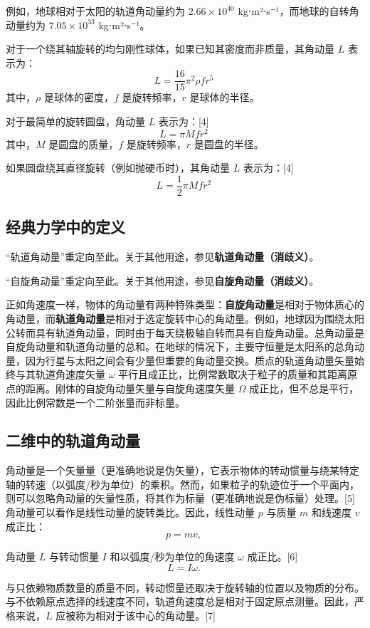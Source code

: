 例如，地球相对于太阳的轨道角动量约为 \( 2.66 \times 10^{40} \) kg⋅m²⋅s⁻¹，而地球的自转角动量约为 \( 7.05 \times 10^{33} \) kg⋅m²⋅s⁻¹。

对于一个绕其轴旋转的均匀刚性球体，如果已知其密度而非质量，其角动量 \( L \) 表示为：
\[
L = \frac{16}{15} \pi^2 \rho fr^5~
\]
其中，\( \rho \) 是球体的密度，\( f \) 是旋转频率，\( r \) 是球体的半径。

对于最简单的旋转圆盘，角动量 \( L \) 表示为：[4]
\[
L = \pi Mfr^2~
\]
其中，\( M \) 是圆盘的质量，\( f \) 是旋转频率，\( r \) 是圆盘的半径。

如果圆盘绕其直径旋转（例如抛硬币时），其角动量 \( L \) 表示为：[4]
\[
L = \frac{1}{2} \pi Mfr^2~
\]
\subsection{经典力学中的定义}   
“轨道角动量”重定向至此。关于其他用途，参见\textbf{轨道角动量（消歧义）}。  

“自旋角动量”重定向至此。关于其他用途，参见\textbf{自旋角动量（消歧义）}。

正如角速度一样，物体的角动量有两种特殊类型：\textbf{自旋角动量}是相对于物体质心的角动量，而\textbf{轨道角动量}是相对于选定旋转中心的角动量。例如，地球因为围绕太阳公转而具有轨道角动量，同时由于每天绕极轴自转而具有自旋角动量。总角动量是自旋角动量和轨道角动量的总和。在地球的情况下，主要守恒量是太阳系的总角动量，因为行星与太阳之间会有少量但重要的角动量交换。质点的轨道角动量矢量始终与其轨道角速度矢量 \( \omega \) 平行且成正比，比例常数取决于粒子的质量和其距离原点的距离。刚体的自旋角动量矢量与自旋角速度矢量 \( \Omega \) 成正比，但不总是平行，因此比例常数是一个二阶张量而非标量。
\subsection{二维中的轨道角动量}
角动量是一个矢量量（更准确地说是伪矢量），它表示物体的转动惯量与绕某特定轴的转速（以弧度/秒为单位）的乘积。然而，如果粒子的轨迹位于一个平面内，则可以忽略角动量的矢量性质，将其作为标量（更准确地说是伪标量）处理。[5] 角动量可以看作是线性动量的旋转类比。因此，线性动量 \( p \) 与质量 \( m \) 和线速度 \( v \) 成正比：
\[
p = mv,~
\]

角动量 \( L \) 与转动惯量 \( I \) 和以弧度/秒为单位的角速度 \( \omega \) 成正比。[6]
\[
L = I\omega.~
\]

与只依赖物质数量的质量不同，转动惯量还取决于旋转轴的位置以及物质的分布。与不依赖原点选择的线速度不同，轨道角速度总是相对于固定原点测量。因此，严格来说，\( L \) 应被称为相对于该中心的角动量。[7]

